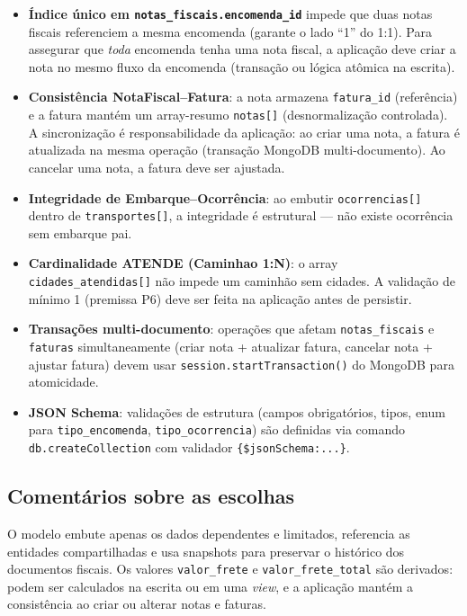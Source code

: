 \begin{itemize}
  \item \textbf{Índice único em \texttt{notas\_fiscais.encomenda\_id}} impede que duas notas fiscais referenciem a mesma encomenda (garante o lado ``1'' do 1:1). Para assegurar que \emph{toda} encomenda tenha uma nota fiscal, a aplicação deve criar a nota no mesmo fluxo da encomenda (transação ou lógica atômica na escrita).
  \item \textbf{Consistência NotaFiscal--Fatura}: a nota armazena \texttt{fatura\_id} (referência) e a fatura mantém um array-resumo \texttt{notas[]} (desnormalização controlada). A sincronização é responsabilidade da aplicação: ao criar uma nota, a fatura é atualizada na mesma operação (transação MongoDB multi-documento). Ao cancelar uma nota, a fatura deve ser ajustada.
  \item \textbf{Integridade de Embarque--Ocorrência}: ao embutir \texttt{ocorrencias[]} dentro de \texttt{transportes[]}, a integridade é estrutural --- não existe ocorrência sem embarque pai.
  \item \textbf{Cardinalidade ATENDE (Caminhao 1:N)}: o array \texttt{cidades\_atendidas[]} não impede um caminhão sem cidades. A validação de mínimo 1 (premissa P6) deve ser feita na aplicação antes de persistir.
  \item \textbf{Transações multi-documento}: operações que afetam \texttt{notas\_fiscais} e \texttt{faturas} simultaneamente (criar nota + atualizar fatura, cancelar nota + ajustar fatura) devem usar \texttt{session.startTransaction()} do MongoDB para atomicidade.
  \item \textbf{JSON Schema}: validações de estrutura (campos obrigatórios, tipos, enum para \texttt{tipo\_encomenda}, \texttt{tipo\_ocorrencia}) são definidas via comando \texttt{db.createCollection} com validador \texttt{\{\$jsonSchema:...\}}.
\end{itemize}

\subsection{Comentários sobre as escolhas}

O modelo embute apenas os dados dependentes e limitados, referencia as entidades compartilhadas e usa snapshots para preservar o histórico dos documentos fiscais. Os valores \texttt{valor\_frete} e \texttt{valor\_frete\_total} são derivados: podem ser calculados na escrita ou em uma \emph{view}, e a aplicação mantém a consistência ao criar ou alterar notas e faturas.
